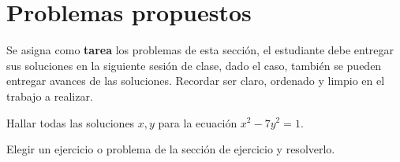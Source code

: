 \section{Problemas propuestos}

Se asigna como \textbf{tarea} los problemas de esta sección, el estudiante debe entregar sus soluciones en la siguiente
sesión de clase, dado el caso, también se pueden entregar avances de las soluciones.
Recordar ser claro, ordenado y limpio en el trabajo a realizar.

\begin{problem}
    Hallar todas las soluciones $x,y$ para la ecuación $x^2 - 7y^2 = 1$.
\end{problem}

\begin{exercise}
    Elegir un ejercicio o problema de la sección de ejercicio y resolverlo.
\end{exercise}